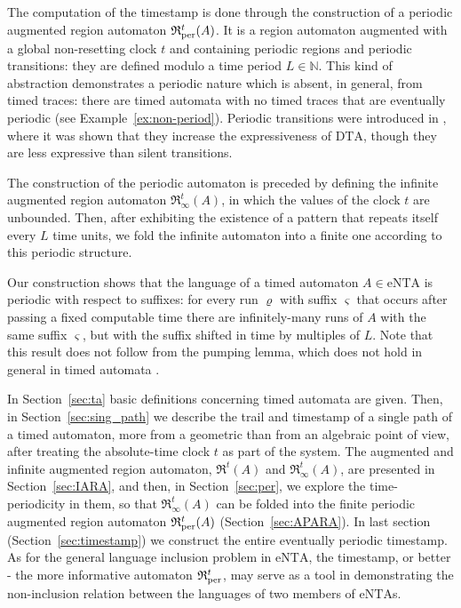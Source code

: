 \documentclass[11pt]{amsart}
\theoremstyle{definition}
\newcommand{\ARRR}{\mathfrak{R}^t}
\newcommand{\IARRR}{\mathfrak{R}_{\infty}^{t}}
\newcommand{\PARRR}{\mathfrak{R}_\textnormal{per}^{t}}
\newcommand{\dta}{\mathrm{DTA}}
\newcommand{\ntaeps}{\mathrm{eNTA}}
\newcommand{\Naturals}{\mathbb{N}}
\begin{document}
The computation of the timestamp is done through the construction of a periodic augmented region automaton $\PARRR(A)$.
It is a region automaton augmented with a global non-resetting clock $t$ and containing periodic regions and periodic transitions: they are defined modulo a time period $L \in \Naturals$.
This kind of abstraction demonstrates a periodic nature which is absent, in general, from timed traces: there are timed automata with no timed traces that are eventually periodic (see Example~\ref{ex:non-period}).
Periodic transitions were introduced in \cite{periodic}, where it was shown that they increase the expressiveness of $\dta$, though they are less expressive than silent transitions.

The construction of the periodic automaton is preceded by defining the infinite augmented region automaton $\IARRR(A)$, in which the values of the clock $t$ are unbounded.
Then, after exhibiting the existence of a pattern that repeats itself every $L$ time units, we fold the infinite automaton into a finite one according to this periodic structure.

Our construction shows that the language of a timed automaton $A \in \ntaeps$ is periodic with respect to suffixes: for every run $\varrho$ with suffix $\varsigma$ that occurs after passing a fixed computable time there are infinitely-many runs of $A$ with the same suffix $\varsigma$, but with the suffix shifted in time by multiples of $L$.
Note that this result does not follow from the pumping lemma, which does not hold in general in timed automata \cite{pumping}. 

In Section~\ref{sec:ta} basic definitions concerning timed automata are given.
Then, in Section~\ref{sec:sing_path} we describe the trail and timestamp of a single path of a timed automaton, more from a geometric than from an algebraic point of view, after treating the absolute-time clock $t$ as part of the system.
The augmented and infinite augmented region automaton, $\ARRR(A)$ and $\IARRR(A)$, are presented in Section~\ref{sec:IARA}, and then, in Section~\ref{sec:per}, we explore the time-periodicity in them, so that $\IARRR(A)$ can be folded into the finite periodic augmented region automaton $\PARRR(A)$ (Section~\ref{sec:APARA}).
In last section (Section~\ref{sec:timestamp}) we construct the entire eventually periodic timestamp.
As for the general language inclusion problem in $\ntaeps$, the timestamp, or better - the more informative automaton $\PARRR$, may serve as a tool in demonstrating the non-inclusion relation between the languages of two members of $\ntaeps$s.
\end{document}
